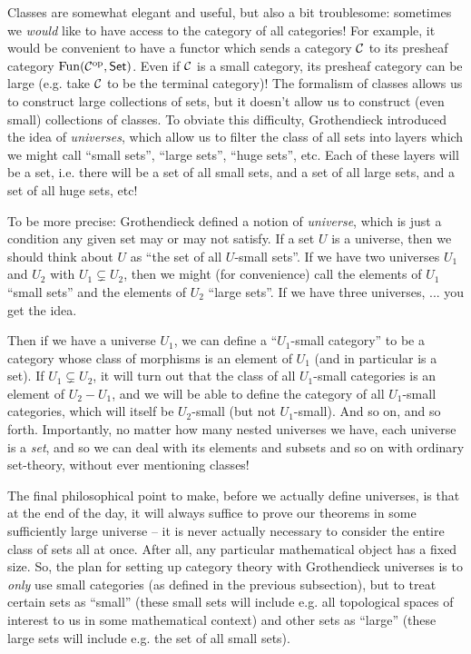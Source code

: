 Classes are somewhat elegant and useful, but also a bit troublesome: sometimes we \emph{would} like to have access to the category of all categories! For example, it would be convenient to have a functor which sends a category $\mathcal{C}$ to its presheaf category $\operatorname{Fun}(\mathcal{C}^{\mathrm{op}}, \mathsf{Set})$. Even if $\mathcal{C}$ is a small category, its presheaf category can be large (e.g. take $\mathcal{C}$ to be the terminal category)! The formalism of classes allows us to construct large collections of sets, but it doesn't allow us to construct (even small) collections of classes. To obviate this difficulty, Grothendieck introduced the idea of \emph{universes}, which allow us to filter the class of all sets into layers which we might call ``small sets'', ``large sets'', ``huge sets'', etc. Each of these layers will be a set, i.e. there will be a set of all small sets, and a set of all large sets, and a set of all huge sets, etc!

To be more precise: Grothendieck defined a notion of \emph{universe}, which is just a condition any given set may or may not satisfy. If a set $U$ is a universe, then we should think about $U$ as ``the set of all $U$-small sets''. If we have two universes $U_1$ and $U_2$ with $U_1 \subsetneq U_2$, then we might (for convenience) call the elements of $U_1$ ``small sets'' and the elements of $U_2$ ``large sets''. If we have three universes, ... you get the idea.

Then if we have a universe $U_1$, we can define a ``$U_1$-small category'' to be a category whose class of morphisms is an element of $U_1$ (and in particular is a set). If $U_1 \subsetneq U_2$, it will turn out that the class of all $U_1$-small categories is an element of $U_2 - U_1$, and we will be able to define the category of all $U_1$-small categories, which will itself be $U_2$-small (but not $U_1$-small). And so on, and so forth. Importantly, no matter how many nested universes we have, each universe is a \emph{set}, and so we can deal with its elements and subsets and so on with ordinary set-theory, without ever mentioning classes!

The final philosophical point to make, before we actually define universes, is that at the end of the day, it will always suffice to prove our theorems in some sufficiently large universe -- it is never actually necessary to consider the entire class of sets all at once. After all, any particular mathematical object has a fixed size. So, the plan for setting up category theory with Grothendieck universes is to \emph{only} use small categories (as defined in the previous subsection), but to treat certain sets as ``small'' (these small sets will include e.g. all topological spaces of interest to us in some mathematical context) and other sets as ``large'' (these large sets will include e.g. the set of all small sets).

